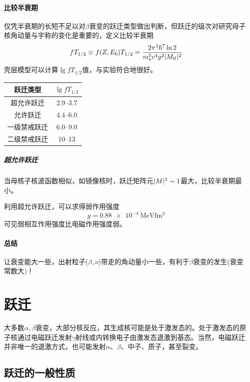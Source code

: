 \paragraph{比较半衰期}仅凭半衰期的长短不足以对$\beta$衰变的跃迁类型做出判断，但跃迁的级次对研究母子核角动量与宇称的变化是重要的，定义比较半衰期
\begin{align}
	fT_{1/2} \equiv f(Z,E_0)T_{1/2} = \frac{2\pi^3\hbar^7\ln2}{m_{\mathrm{e}}^5c^4g^2\lvert M_{\mathrm i\mathrm f}\rvert^2}
\end{align}
壳层模型可以计算$\lg fT_{1/2}$值，与实验符合地很好。
\begin{notecaptionblock}
	\begin{tabular}{cc}
		\toprule
		跃迁类型&$\lg fT_{1/2}$\\
		\midrule
		超允许跃迁&\numrange{2.9}{3.7}\\
		允许跃迁&\numrange{4.4}{6.0}\\
		一级禁戒跃迁&\numrange{6.0}{9.0}\\
		二级禁戒跃迁&\numrange{10}{13}\\
		\bottomrule
	\end{tabular}
\end{notecaptionblock}
\subparagraph{超允许跃迁}当母核子核波函数相似，如镜像核时，跃迁矩阵元$\lvert M\rvert^2 \sim 1$最大，比较半衰期最小。

利用超允许跃迁，可以求得弱作用强度
\[
	g = \qty{0.88e-4}{\mega\electronvolt\femto\metre\cubed}
\]
可见弱相互作用强度比电磁作用强度弱。
\paragraph{总结}
让衰变能大一些，出射粒子($\beta,\nu$)带走的角动量小一些，有利于$\beta$衰变的发生(衰变常数大)！

\section{\gammaray 跃迁}

大多数$\alpha,\beta$衰变，大部分核反应，其生成核可能是处于激发态的。处于激发态的原子核通过电磁跃迁发射$\gamma$射线或内转换电子由激发态退激到基态。当然，电磁跃迁并非唯一的退激方式，也可能发射$\alpha$、$\beta$、中子、质子，甚至裂变。

\subsection{\gammaray 跃迁的一般性质}

